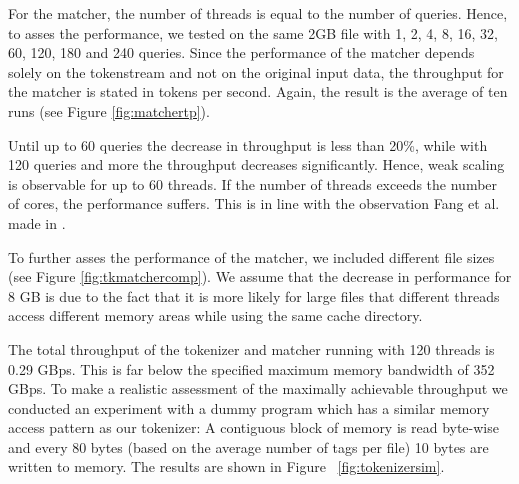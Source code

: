 For the matcher, the number of threads is equal to the number of queries. Hence,
to asses the performance, we tested on the same 2GB file with 1, 2, 4, 8, 16,
32, 60, 120, 180 and 240 queries. Since the performance of the matcher depends
solely on the tokenstream and not on the original input data, the throughput for
the matcher is stated in tokens per second. Again, the result is the average of
ten runs (see Figure \ref{fig:matchertp}).

Until up to 60 queries the decrease in throughput is less than 20\%, while with
120 queries and more the throughput decreases significantly. Hence, weak scaling
is observable for up to 60 threads. If the number of threads exceeds the number
of cores, the performance suffers. This is in line with the observation Fang et
al. made in \cite{Fang14}.

To further asses the performance of the matcher, we included different file
sizes (see Figure \ref{fig:tkmatchercomp}). We assume that the decrease in
performance for 8 GB is due to the fact that it is more likely for large files
that different threads access different memory areas while using the same cache
directory.

The total throughput of the tokenizer and matcher running with 120 threads is
0.29 GBps. This is far below the specified maximum memory bandwidth of 352
GBps. To make a realistic assessment of the maximally achievable throughput
we conducted an experiment with a dummy program which has a similar memory
access pattern as our tokenizer: A contiguous block of memory is read byte-wise
and every 80 bytes (based on the average number of tags per file) 10 bytes are
written to memory. The results are shown in Figure ~\ref{fig:tokenizersim}.
